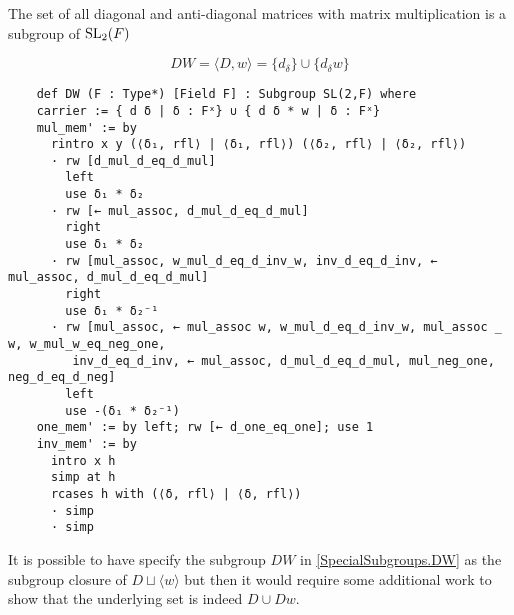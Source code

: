 \begin{definition}
    \label{SpecialSubgroups.DW}
    \leanok
    The set of all diagonal and anti-diagonal matrices with matrix multiplication is a subgroup of $\operatorname{SL}_2(F)$

    \begin{equation}\label{antidiag} DW = \langle D, w\rangle  = \{d_\delta \} \cup \{ d_\delta w \} 
    \end{equation}
\end{definition}
\begin{footnotesize}
\begin{verbatim}
    def DW (F : Type*) [Field F] : Subgroup SL(2,F) where
    carrier := { d δ | δ : Fˣ} ∪ { d δ * w | δ : Fˣ}
    mul_mem' := by
      rintro x y (⟨δ₁, rfl⟩ | ⟨δ₁, rfl⟩) (⟨δ₂, rfl⟩ | ⟨δ₂, rfl⟩)
      · rw [d_mul_d_eq_d_mul]
        left
        use δ₁ * δ₂
      · rw [← mul_assoc, d_mul_d_eq_d_mul]
        right
        use δ₁ * δ₂
      · rw [mul_assoc, w_mul_d_eq_d_inv_w, inv_d_eq_d_inv, ← mul_assoc, d_mul_d_eq_d_mul]
        right
        use δ₁ * δ₂⁻¹
      · rw [mul_assoc, ← mul_assoc w, w_mul_d_eq_d_inv_w, mul_assoc _ w, w_mul_w_eq_neg_one,
         inv_d_eq_d_inv, ← mul_assoc, d_mul_d_eq_d_mul, mul_neg_one, neg_d_eq_d_neg]
        left
        use -(δ₁ * δ₂⁻¹)
    one_mem' := by left; rw [← d_one_eq_one]; use 1
    inv_mem' := by
      intro x h
      simp at h
      rcases h with (⟨δ, rfl⟩ | ⟨δ, rfl⟩)
      · simp
      · simp
\end{verbatim}
\end{footnotesize}

\begin{remark}
    It is possible to have specify the subgroup $DW$ in \ref{SpecialSubgroups.DW} as the subgroup closure of $D \sqcup \langle w \rangle$
    but then it would require some additional work to show that the underlying set is indeed $D \cup Dw$.
\end{remark}


